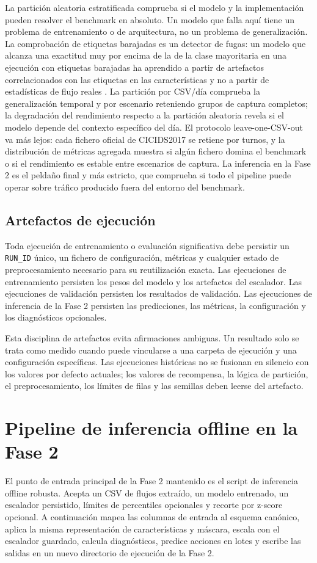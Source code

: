 La partición aleatoria estratificada comprueba si el modelo y la implementación pueden resolver el benchmark en absoluto. Un modelo que falla aquí tiene un problema de entrenamiento o de arquitectura, no un problema de generalización. La comprobación de etiquetas barajadas es un detector de fugas: un modelo que alcanza una exactitud muy por encima de la de la clase mayoritaria en una ejecución con etiquetas barajadas ha aprendido a partir de artefactos correlacionados con las etiquetas en las características y no a partir de estadísticas de flujo reales \parencite{Arp2020DosDontsMLSecurity}. La partición por CSV/día comprueba la generalización temporal y por escenario reteniendo grupos de captura completos; la degradación del rendimiento respecto a la partición aleatoria revela si el modelo depende del contexto específico del día. El protocolo leave-one-CSV-out va más lejos: cada fichero oficial de CICIDS2017 se retiene por turnos, y la distribución de métricas agregada muestra si algún fichero domina el benchmark o si el rendimiento es estable entre escenarios de captura. La inferencia en la Fase 2 es el peldaño final y más estricto, que comprueba si todo el pipeline puede operar sobre tráfico producido fuera del entorno del benchmark.

\subsection{Artefactos de ejecución}
Toda ejecución de entrenamiento o evaluación significativa debe persistir un \texttt{RUN\_ID} único, un fichero de configuración, métricas y cualquier estado de preprocesamiento necesario para su reutilización exacta. Las ejecuciones de entrenamiento persisten los pesos del modelo y los artefactos del escalador. Las ejecuciones de validación persisten los resultados de validación. Las ejecuciones de inferencia de la Fase 2 persisten las predicciones, las métricas, la configuración y los diagnósticos opcionales.

Esta disciplina de artefactos evita afirmaciones ambiguas. Un resultado solo se trata como medido cuando puede vincularse a una carpeta de ejecución y una configuración específicas. Las ejecuciones históricas no se fusionan en silencio con los valores por defecto actuales; los valores de recompensa, la lógica de partición, el preprocesamiento, los límites de filas y las semillas deben leerse del artefacto.

\section{Pipeline de inferencia offline en la Fase 2}
El punto de entrada principal de la Fase 2 mantenido es el script de inferencia offline robusta. Acepta un CSV de flujos extraído, un modelo entrenado, un escalador persistido, límites de percentiles opcionales y recorte por z-score opcional. A continuación mapea las columnas de entrada al esquema canónico, aplica la misma representación de características y máscara, escala con el escalador guardado, calcula diagnósticos, predice acciones en lotes y escribe las salidas en un nuevo directorio de ejecución de la Fase 2.

